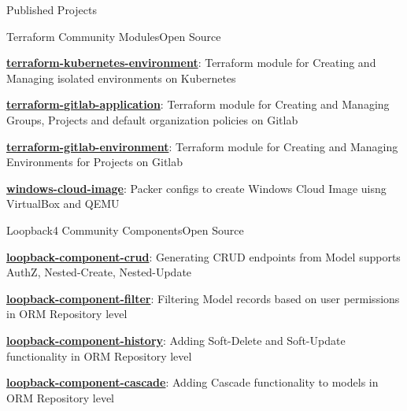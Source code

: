 \documentclass[]{main}
\begin{document}
\begin{section}{Published Projects}
\begin{subsection}{Terraform Community Modules}{Open Source}{}{}
        \item \href{https://github.com/cktf/terraform-kubernetes-environment}{\textbf{terraform-kubernetes-environment}}: Terraform module for Creating and Managing isolated environments on Kubernetes \;\href{https://github.com/cktf/terraform-kubernetes-environment}{\faExternalLink*}
        \item \href{https://github.com/cktf/terraform-gitlab-application}{\textbf{terraform-gitlab-application}}: Terraform module for Creating and Managing Groups, Projects and default organization policies on Gitlab \;\href{https://github.com/cktf/terraform-gitlab-application}{\faExternalLink*}
        \item \href{https://github.com/cktf/terraform-gitlab-environment}{\textbf{terraform-gitlab-environment}}: Terraform module for Creating and Managing Environments for Projects on Gitlab \;\href{https://github.com/cktf/terraform-gitlab-environment}{\faExternalLink*}
        \item \href{https://github.com/ckoliber/windows-cloud-image}{\textbf{windows-cloud-image}}: Packer configs to create Windows Cloud Image uisng VirtualBox and QEMU \;\href{https://github.com/ckoliber/windows-cloud-image}{\faExternalLink*}
        \end{subsection}
\begin{subsection}{Loopback4 Community Components}{Open Source}{}{}
        \item \href{https://github.com/loopback4/loopback-component-crud}{\textbf{loopback-component-crud}}: Generating CRUD endpoints from Model supports AuthZ, Nested-Create, Nested-Update \;\href{https://github.com/loopback4/loopback-component-crud}{\faExternalLink*}
        \item \href{https://github.com/loopback4/loopback-component-filter}{\textbf{loopback-component-filter}}: Filtering Model records based on user permissions in ORM Repository level \;\href{https://github.com/loopback4/loopback-component-filter}{\faExternalLink*}
        \item \href{https://github.com/loopback4/loopback-component-history}{\textbf{loopback-component-history}}: Adding Soft-Delete and Soft-Update functionality in ORM Repository level \;\href{https://github.com/loopback4/loopback-component-history}{\faExternalLink*}
        \item \href{https://github.com/loopback4/loopback-component-cascade}{\textbf{loopback-component-cascade}}: Adding Cascade functionality to models in ORM Repository level \;\href{https://github.com/loopback4/loopback-component-cascade}{\faExternalLink*}

\end{subsection}
\end{section}
\end{document}
